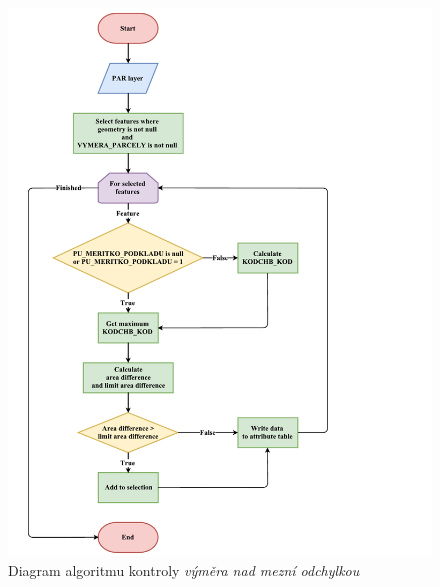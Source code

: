 	\begin{figure}[H]
		\centering
		\includegraphics[width=1.2\textwidth]{./pictures/vymera.pdf}
		\caption[Diagram algoritmu kontroly \textit{výměra nad mezní odchylkou}]{Diagram algoritmu kontroly \textit{výměra nad mezní odchylkou}}
		\label{fig:diagram_vymera}
 	\end{figure}

